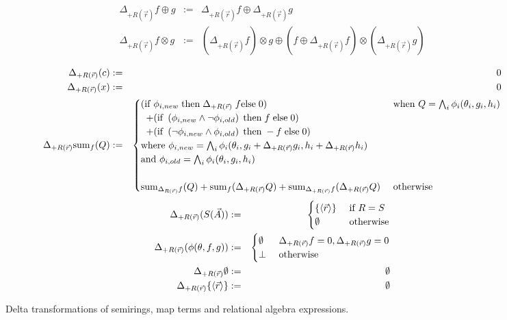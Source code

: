 \begin{figure*}
\begin{align*}
\Delta_{+R(\vec{r})} f \oplus g & := & \Delta_{+R(\vec{r})} f \oplus \Delta_{+R(\vec{r})} g \\
\Delta_{+R(\vec{r})} f \otimes g & := &
(\Delta_{+R(\vec{r})}f)\otimes g \oplus
(f \oplus \Delta_{+R(\vec{r})} f)\otimes(\Delta_{+R(\vec{r})}g)\\
\end{align*}
\begin{align*}
\Delta_{+R(\vec{r})}(c) & := & 0 \\
\Delta_{+R(\vec{r})}(x) & := & 0 \\
\Delta_{+R(\vec{r})} \mathrm{sum}_{f}(Q) & := &
\begin{cases}
(\mathrm{if}\; \phi_{i,new} \;
\mathrm{then}\; \Delta_{+R(\vec{r})}\; f \mathrm{else}\; 0)
& \mbox{ when $Q = \bigwedge_i \phi_i(\theta_i,g_i,h_i)$}\\
\;\; + (\mathrm{if}\;
  \left( \phi_{i,new} \wedge \neg \phi_{i,old } \right)
\; \mathrm{then}\; f \;\mathrm{else}\; 0)\\
\;\; + (\mathrm{if}\;
\left( \neg \phi_{i,new} \wedge \phi_{i,old} \right) \;
\mathrm{then}\; -f \;\mathrm{else}\; 0)
\\
\mbox{where }
  \phi_{i,new} = \bigwedge_i
    \phi_i(\theta_i, g_i+\Delta_{+R(\vec{r})}g_i, h_i + \Delta_{+R(\vec{r})}h_i)
\\
\mbox{and }
  \phi_{i,old} = \bigwedge_i \phi_i(\theta_i, g_i, h_i)
\\
\\
\mathrm{sum}_{\Delta_{R(\vec{r})}f}(Q) + \mathrm{sum}_{f}(\Delta_{+R(\vec{r})} Q) +
\mathrm{sum}_{\Delta_{+R(\vec{r})}f}(\Delta_{+R(\vec{r})} Q)
& \mbox{ otherwise}
\end{cases}
\end{align*}
\begin{align*}
\Delta_{+R(\vec{r})}(S(\vec{A}))         & := & 
\begin{cases}
\{{\langle\vec{r}\rangle}\} & \mbox{ if $R = S$}\\
\emptyset           & \mbox{ otherwise}
\end{cases}
\\
\Delta_{+R(\vec{r})}(\phi(\theta, f, g)) & := &
\begin{cases}
\emptyset & \mbox{ $\Delta_{+R(\vec{r})} f = 0, \Delta_{+R(\vec{r})} g = 0$}\\
\bot      & \mbox{ otherwise}
\end{cases}
\\
\Delta_{+R(\vec{r})} \emptyset           & := & \emptyset \\
\Delta_{+R(\vec{r})} \{{\langle\vec{r}\rangle}\} & := & \emptyset \\
\end{align*}
\label{fig:delta}
\caption{Delta transformations of semirings, map terms and relational algebra
  expressions. }
\end{figure*}

